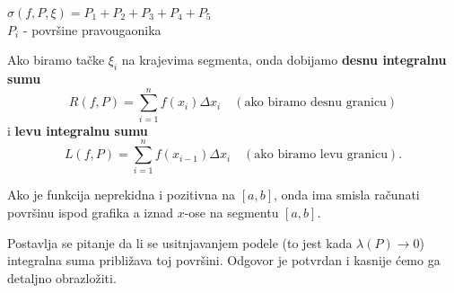 \documentclass[a4paper,12pt,twoside]{report}
\numberwithin{algorithm}{section}
\begin{document}
\vspace{-0.5cm}
\begin{flushright}
    $\sigma(f, P, \xi) = P_1 + P_2 + P_3 + P_4 + P_5$ \\
    $P_i$ - površine pravougaonika
\end{flushright}

\vspace{0.5cm}
Ako biramo tačke $\xi_i$ na krajevima segmenta, onda dobijamo \textbf{desnu integralnu sumu} 
\[
    R(f, P) = \sum_{i=1}^n f(x_i) \Delta x_i \quad (\text{ako biramo desnu granicu})
\]
i \textbf{levu integralnu sumu}
\[
    L(f, P) = \sum_{i=1}^n f(x_{i-1}) \Delta x_i \quad (\text{ako biramo levu granicu}).
\]

Ako je funkcija neprekidna i pozitivna na $[a, b]$, onda ima smisla računati površinu ispod grafika a iznad $x$-ose na segmentu $[a, b]$.

\begin{center}
\end{center}
Postavlja se pitanje da li se usitnjavanjem podele (to jest kada $\lambda(P) \to 0$) integralna suma približava toj površini. Odgovor je potvrdan i kasnije ćemo ga detaljno obrazložiti.
\end{document}
